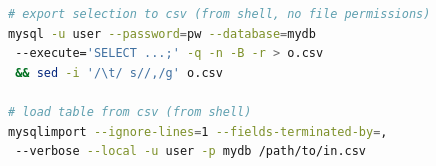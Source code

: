 \begin{lstlisting}[language=bash]
# export selection to csv (from shell, no file permissions)
mysql -u user --password=pw --database=mydb
 --execute='SELECT ...;' -q -n -B -r > o.csv
 && sed -i '/\t/ s//,/g' o.csv

# load table from csv (from shell)
mysqlimport --ignore-lines=1 --fields-terminated-by=,
 --verbose --local -u user -p mydb /path/to/in.csv
\end{lstlisting}
